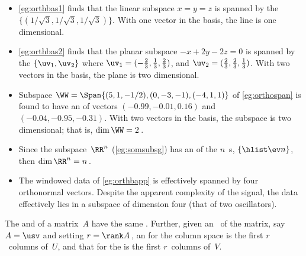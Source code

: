 \begin{example} 
\begin{itemize}
\item \cref{eg:orthbas1} finds that the linear subspace \(x=y=z\) is spanned by the  \(\{(1/{\sqrt3},1/{\sqrt3},1/{\sqrt3})\}\).  
With one vector in the basis, the line is one dimensional.

\item \cref{eg:orthbas2} finds that the planar subspace \(-x+2y-2z=0\) is spanned by the  \(\{\uv_1,\uv_2\}\) where \(\uv_1=(-\frac23,\frac13,\frac23)\), and \(\uv_2=(\frac23,\frac23,\frac13)\).  
With two vectors in the basis, the plane is two dimensional.

\item  Subspace \(\WW=\Span\{(5,1,-1/2),(0,-3,-1),(-4,1,1)\}\) of \cref{eg:orthospan} is found to have an  of  vectors  \((-0.99,-0.01,0.16)\) and \((-0.04,-0.95,-0.31)\).
With two vectors in the basis, the subspace is two dimensional; that is, \(\dim\WW=2\)\,.

\item Since the subspace~\(\RR^n\) (\cref{eg:somsubsg}) has an  of the \(n\)~s, \(\{\hlist\ev n\}\), then  \(\dim\RR^n=n\)\,.

\item The  windowed data of \cref{eg:orthbapp} is effectively spanned by four orthonormal vectors.  Despite the apparent complexity of the signal, the data effectively lies in a subspace of dimension four (that of two oscillators).
\end{itemize}
\end{example}


\begin{theorem} \label{thm:rowcolD} 
The  and  of a matrix~\(A\) have the same .
Further, given an \svd\ of the matrix, say \(A=\usv\) and setting \(r=\rank A\)\,, an  for the column space is the first \(r\)~columns of~\(U\), and that for the  is the first \(r\)~columns of~\(V\).
\end{theorem}

